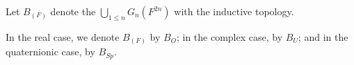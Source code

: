 Let $B_{(F)}$ denote the $\bigcup_{1 \leq n} G_n(F^{2n})$ with the inductive topology.

In the real case, we denote $B_{(F)}$ by $B_O$; in the complex case, by $B_U$; and in the quaternionic case, by $B_{Sp}$.
